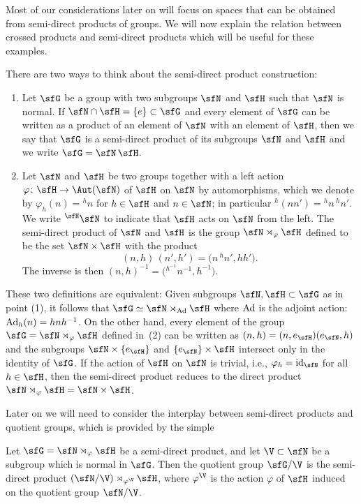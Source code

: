 Most of our considerations later on will focus on spaces that can be
obtained from semi-direct products of groups. We will now explain the
relation between crossed products and semi-direct products which will
be useful for these examples.

There are two ways to think about the semi-direct product construction:
\begin{enumerate}\itemsep=0pt
\item[(1)] Let $\sfG$ be a
group with two subgroups $\sfN $ and $\sfH$ such that $\sfN $ is normal. If $\sfN \cap
\sfH=\{e\}\subset \sfG$ and every
element of $\sfG$ can be written as a product of an element of
$\sfN $ with an element of $\sfH$, then we say that $\sfG$ is a semi-direct
product of its subgroups $\sfN $ and $\sfH$ and we write $\sfG=\sfN \,\sfH$.

\item[(2)]
Let $\sfN $ and $\sfH$ be two groups together with a left action
$\varphi\colon \sfH\to\Aut(\sfN )$ of $\sfH$ on $\sfN $ by automorphisms, which we denote by
$\varphi_h(n)={}^hn$ for $h\in \sfH$ and $n\in \sfN $; in particular
${}^h(n n')={}^hn\, {}^hn'$. We write ${}^\sfH \sfN $ to
indicate that $\sfH $ acts on $\sfN $ from the left. The semi-direct product
of $\sfN $ and $\sfH $ is the group $\sfN \rtimes_\varphi \sfH $ defined to be the set
$\sfN \times \sfH $ with the product
\[
(n,h)\,(n',h') = \big(n\,{}^hn',h h'\big) .
\]
The inverse is then $(n,h)^{-1}=\big({}^{h^{-1\!}}{n^{-1}},h^{-1}\big)$.
\end{enumerate}
These two definitions are equivalent: Given subgroups $\sfN ,\sfH \subset \sfG$ as
in point (1), it follows that $\sfG\simeq \sfN \rtimes_{\rm Ad} \sfH $
where ${\rm Ad}$ is the adjoint action: ${\rm Ad}_h(n)=h n h^{-1}$. On the other
hand, every element of the group $\sfG=\sfN \rtimes_\varphi \sfH $ defined in~(2) can be written as $(n,h)=(n,e_\sfH) (e_\sfN,h)$ and the subgroups $\sfN \times\{e_\sfH\}$
and $\{e_\sfN\} \times \sfH $ intersect only in the identity of $\sfG$.
If the action of $\sfH $ on $\sfN $ is trivial,
i.e., $\varphi_h={\rm id}_\sfN $ for all $h\in \sfH $, then the semi-direct
product reduces to the direct product $\sfN \rtimes_\varphi
\sfH =\sfN \times \sfH $.

Later on we will need to consider the interplay between semi-direct
products and quotient groups, which is provided by the simple
\begin{Lemma}
\label{lem:semidirectquotient}
Let $\sfG=\sfN\rtimes_\varphi\sfH$ be a semi-direct
product, and let $\V\subset \sfN$ be a subgroup which is normal in
$\sfG$. Then the quotient group $\sfG/\V$ is the
semi-direct product $(\sfN/\V)\rtimes_{\varphi^\V}\sfH$, where
${\varphi^\V}$ is the action $\varphi$ of $\sfH$ induced on the
quotient group $\sfN/\V$.
\end{Lemma}

